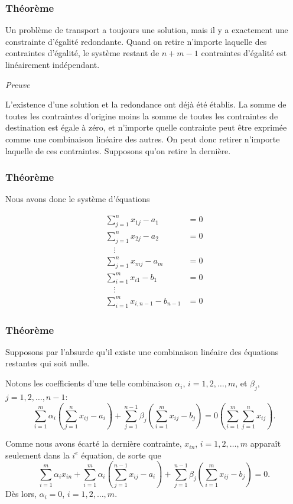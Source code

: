 \documentclass[usepdftitle=false]{beamer}
\begin{document}
\begin{frame}
\frametitle{Théorème}

Un problème de transport a toujours une solution, mais il y a exactement une constrainte d'égalité redondante.
Quand on retire n'importe laquelle des contraintes d'égalité, le système restant de $n+m-1$ contraintes d'égalité est linéairement indépendant.

\mbox{}

\emph{Preuve}

\mbox{}

L'existence d'une solution et la redondance ont déjà été établis.
La somme de toutes les contraintes d'origine moins la somme de toutes les contraintes de destination est égale à zéro, et n'importe quelle contrainte peut être exprimée comme une combinaison linéaire des autres. On peut donc retirer n'importe laquelle de ces contraintes. Supposons qu'on retire la dernière.

\end{frame}

\begin{frame}
\frametitle{Théorème}

Nous avons donc le système d'équations
\begin{footnotesize}
\begin{align*}
\sum_{j = 1}^n x_{1j} - a_1 & = 0  \\
\sum_{j = 1}^n x_{2j} - a_2 & = 0  \\
\quad \vdots & \\
\sum_{j = 1}^n x_{mj} - a_m & = 0  \\
\sum_{i = 1}^m x_{i1} - b_1 & = 0  \\
\quad \vdots & \\
\sum_{i = 1}^m x_{i,{n-1}} - b_{n-1} & = 0
\end{align*}
\end{footnotesize}

\end{frame}

\begin{frame}
\frametitle{Théorème}

Supposons par l'absurde qu'il existe une combinaison linéaire des équations restantes qui soit nulle.

Notons les coefficients d'une telle combinaison $\alpha_i$, $i = 1,2,\ldots,m$, et $\beta_j$, $j = 1,2,\ldots,n-1$:
\[
\sum_{i = 1}^m \alpha_i \left( \sum_{j = 1}^n x_{ij} - a_i \right) +
\sum_{j = 1}^{n-1} \beta_j \left( \sum_{i = 1}^m x_{ij} - b_j \right) = 0\left( \sum_{i = 1}^m \sum_{j = 1}^n x_{ij} \right).
\]

\mbox{}

Comme nous avons écarté la dernière contrainte, $x_{in}$, $i = 1,2,\ldots,m$ apparaît seulement dans la $i^e$ équation, de sorte que
\[
\sum_{i = 1}^m \alpha_i x_{in} + \sum_{i = 1}^m \alpha_i \left( \sum_{j = 1}^{n-1} x_{ij} - a_i \right) +
\sum_{j = 1}^{n-1} \beta_j \left( \sum_{i = 1}^m x_{ij} - b_j \right) = 0.
\]
Dès lors, $\alpha_i = 0$, $i = 1, 2,\ldots,m$.

\end{frame}
\end{document}
